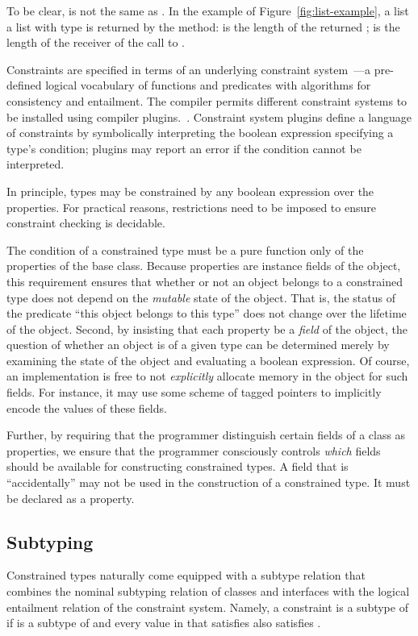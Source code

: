 To be clear,  is not the same as .  In the
 example of Figure~\ref{fig:list-example}, a list
a list with type
 is returned by the 
 method:   is the length of
the returned ;  is the length of the 
receiver of the call to .

Constraints are specified in terms of an underlying
constraint system~\cite{CCCC}---a pre-defined logical vocabulary of
functions and predicates with algorithms for consistency and
entailment.  The \Xten{} compiler permits different constraint
systems to be installed using compiler plugins.~\cite{??}.
%
Constraint system plugins define a language of constraints by
symbolically interpreting
the boolean expression specifying a type's condition; plugins
may report an error if the condition cannot be interpreted.

In principle, types may be constrained by any boolean
expression over the properties.  For practical reasons,
restrictions need to be imposed to ensure constraint checking is
decidable.

The condition of a constrained type must be a pure
function only of the properties of the base class.
Because properties are
 instance fields of the object,
this requirement
ensures that whether or not an object belongs to a constrained type does
not depend on the {\em mutable} state of the object.
That is, the status of the
predicate ``this object belongs to this type'' does not
change over the lifetime of the object.  Second, by insisting that each
property be a {\em field} of the object, the question of
whether an object is of a given type can be
determined merely by examining the state of the object and evaluating
a boolean expression. Of course, an implementation is free to not {\em
explicitly} allocate memory in the object for such fields. For
instance, it may use some scheme of tagged pointers to implicitly
encode the values of these fields.

Further, by requiring that the programmer distinguish certain
 fields of a class as properties, we ensure that the programmer
consciously controls {\em which}  fields should be available for
constructing constrained types. A field that is ``accidentally''
 may not be used in the construction of a constrained type. It must be
declared as a property.


\subsection{Subtyping}
Constrained types naturally come equipped with a subtype relation that
combines the nominal subtyping relation of classes and interfaces with
the logical entailment relation of the constraint system. Namely, a
constraint  is a subtype of  if  is a
subtype of  and every value in  that satisfies 
also satisfies .

